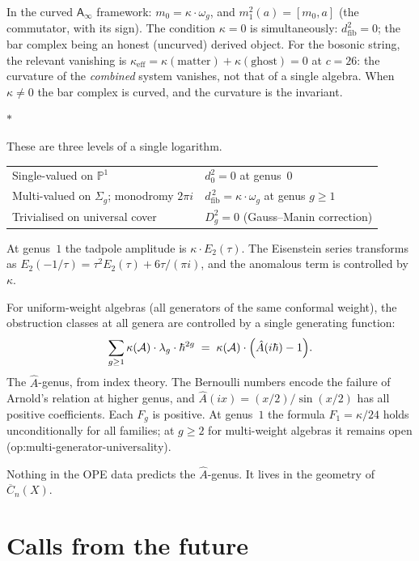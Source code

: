 \documentclass[11pt]{article}
\newcommand{\cA}{\mathcal{A}}
\newcommand{\bP}{\mathbb{P}}
\newcommand{\Ainf}{\mathsf{A}_{\infty}}
\newcommand{\dzero}{d_0}
\newcommand{\dfib}{d_{\mathrm{fib}}}
\newcommand{\Dg}[1]{D_{#1}}
\newcommand{\sep}{\bigskip\begin{center}$*$\end{center}\medskip}
\begin{document}
In the curved $\Ainf$ framework: $m_0 = \kappa \cdot \omega_g$,
and $m_1^2(a) = [m_0, a]$ (the commutator, with its sign).
The condition $\kappa = 0$ is simultaneously: $\dfib^2 = 0$;
the bar complex being an honest (uncurved) derived object.
For the bosonic string, the relevant vanishing is
$\kappa_{\mathrm{eff}} = \kappa(\mathrm{matter})
+ \kappa(\mathrm{ghost}) = 0$ at $c = 26$: the curvature of
the \emph{combined} system vanishes, not that of a single
algebra.  When $\kappa \neq 0$ the bar complex is curved,
and the curvature is the invariant.

\sep

These are three levels of a single logarithm.

\begin{center}
\small
\begin{tabular}{@{}ll@{}}
Single-valued on $\bP^1$
  & $\dzero^2 = 0$ at genus~$0$ \\[3pt]
Multi-valued on $\Sigma_g$; monodromy $2\pi i$
  & $\dfib^{\,2} = \kappa \cdot \omega_g$ at genus $g \geq 1$ \\[3pt]
Trivialised on universal cover
  & $\Dg{g}^2 = 0$ (Gauss--Manin correction)
\end{tabular}
\end{center}

\medskip

At genus~$1$ the tadpole amplitude is $\kappa \cdot E_2(\tau)$.
The Eisenstein series transforms as
$E_2(-1/\tau) = \tau^2 E_2(\tau) + 6\tau/(\pi i)$, and the
anomalous term is controlled by $\kappa$.

For uniform-weight algebras (all generators of the same
conformal weight), the obstruction classes at all genera are
controlled by a single generating function:
\[
\sum_{g \geq 1} \kappa(\cA) \cdot \lambda_g \cdot \hbar^{2g}
\;=\;
\kappa(\cA) \cdot \Bigl(\hat{A}(i\hbar) - 1\Bigr).
\]
The $\hat{A}$-genus, from index theory.  The Bernoulli numbers
encode the failure of Arnold's relation at higher genus, and
$\hat{A}(ix) = (x/2)/\sin(x/2)$ has all positive coefficients.
Each $F_g$ is positive.  At genus~$1$ the formula
$F_1 = \kappa/24$ holds unconditionally for all families;
at $g \geq 2$ for multi-weight algebras it remains open
(op:multi-generator-universality).

Nothing in the OPE data predicts the $\hat{A}$-genus.  It lives
in the geometry of $\overline{C}_n(X)$.


\section{Calls from the future}
\label{sec:calls}
\end{document}
